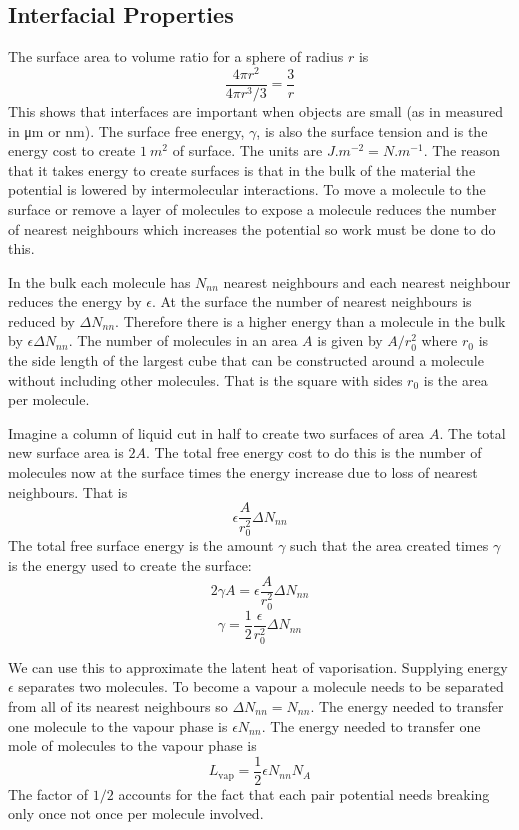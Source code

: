 \documentclass{article}
\begin{document}
    \subsection{Interfacial Properties}
    The surface area to volume ratio for a sphere of radius \(r\) is
    \[\frac{4\pi r^2}{4\pi r^3/3} = \frac{3}{r}\]
    This shows that interfaces are important when objects are small (as in measured in \si{\micro m} or \si{\nano m}).
    The surface free energy, \(\gamma\), is also the surface tension and is the energy cost to create \(\SI{1}{m^2}\) of surface.
    The units are \(\si{J.m^{-2}} = \si{N.m^{-1}}\).
    The reason that it takes energy to create surfaces is that in the bulk of the material the potential is lowered by intermolecular interactions.
    To move a molecule to the surface or remove a layer of molecules to expose a molecule reduces the number of nearest neighbours which increases the potential so work must be done to do this.
    
    In the bulk each molecule has \(N_{nn}\) nearest neighbours and each nearest neighbour reduces the energy by \(\epsilon\).
    At the surface the number of nearest neighbours is reduced by \(\Delta N_{nn}\).
    Therefore there is a higher energy than a molecule in the bulk by \(\epsilon\Delta N_{nn}\).
    The number of molecules in an area \(A\) is given by \(A/r_0^2\)
    where \(r_0\) is the side length of the largest cube that can be constructed around a molecule without including other molecules.
    That is the square with sides \(r_0\) is the area per molecule.
    
    Imagine a column of liquid cut in half to create two surfaces of area \(A\).
    The total new surface area is \(2A\).
    The total free energy cost to do this is the number of molecules now at the surface times the energy increase due to loss of nearest neighbours.
    That is
    \[\epsilon \frac{A}{r_0^2}\Delta N_{nn}\]
    The total free surface energy is the amount \(\gamma\) such that the area created times \(\gamma\) is the energy used to create the surface:
    \[2\gamma A = \epsilon\frac{A}{r_0^2}\Delta N_{nn}\]
    \[\gamma = \frac{1}{2}\frac{\epsilon}{r_0^2}\Delta N_{nn}\]
    
    We can use this to approximate the latent heat of vaporisation.
    Supplying energy \(\epsilon\) separates two molecules.
    To become a vapour a molecule needs to be separated from all of its nearest neighbours so \(\Delta N_{nn} = N_{nn}\).
    The energy needed to transfer one molecule to the vapour phase is \(\epsilon N_{nn}\).
    The energy needed to transfer one mole of molecules to the vapour phase is 
    \[L_\text{vap} = \frac{1}{2}\epsilon N_{nn}N_A\]
    The factor of \(1/2\) accounts for the fact that each pair potential needs breaking only once not once per molecule involved.
    
\end{document}

